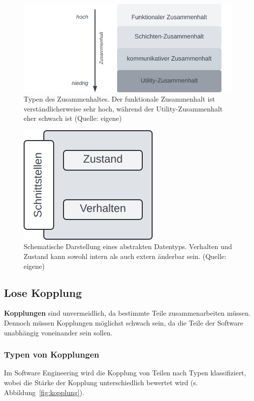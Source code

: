 \begin{figure}
    \centering
    \includegraphics[scale=0.4]{part two/Objektorientierter Entwurf/img/zusammenhalt}
    \caption{Typen des Zusammenhaltes. Der funktionale Zusammenhalt ist verständlicherweise sehr hoch, während der Utility-Zusammenhalt eher schwach ist (Quelle: eigene)}
    \label{fig:zusammenhalt}
\end{figure}


\begin{figure}
    \centering
    \includegraphics[scale=0.4]{part two/Objektorientierter Entwurf/img/adt}
    \caption{Schematische Darstellung eines abstrakten Datentyps. Verhalten und Zustand kann sowohl intern als auch extern änderbar sein.  (Quelle: eigene)}
    \label{fig:adt}
\end{figure}

\subsection{Lose Kopplung}
\textbf{Kopplungen} sind unvermeidlich, da bestimmte Teile zusammenarbeiten müssen.\\
Dennoch müssen Kopplungen möglichst schwach sein, da die Teile der Software unabhängig voneinander sein sollen.

\subsubsection*{Typen von Kopplungen}
Im Software Engineering wird die Kopplung von Teilen nach Typen klassifiziert, wobei die Stärke der Kopplung unterschiedlich bewertet wird (s. Abbildung~\ref{fig:kopplung}).

